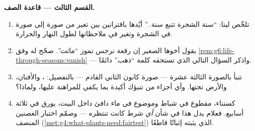 \begin{problem}
\medskip\noindent\textbf{القسم الثالث --- قاعدة الصف.}
\begin{enumerate}[resume]
  \item تلخّص لينا: ``سنة الشجرة تتبع سنة .'' أيّدها
        باقترانين بين تغير من صورة إلى صورة في الشجرة وتغير في
        ملاحظاتها لطول النهار والحرارة.
  \item يقول أخوها الصغير إن رقعة نرجس تموز ``ماتت''. صحّح له
        وفق \cref{rem:g6:life-through-seasons:vanish} --- واذكر
        السؤال التالي الذي تستحقه كلمة ``ذهب'' دائمًا.
  \item تنبأ بالصورة الثالثة عشرة --- صورة كانون الثاني القادم
        --- بالتفصيل: ، والأفنان، والأرض تحتها. وأي أجزاء
        من تنبؤك أكيدة بما يكفي للمراهنة عليها، ولماذا؟
  \item {} كستناء، مقطوع في شباط وموضوع في ماء دافئ داخل البيت،
        يورق في ثلاثة أسابيع. فعلام يدل هذا في شأن \emph{أي}
        شرط كانت  تنتظره --- وصمّم اختبار الغصنين المنصف
        (\cref{met:g4:what-plants-need:fairtest}) الذي يثبته
        إثباتًا قاطعًا.
\end{enumerate}
\end{problem}
